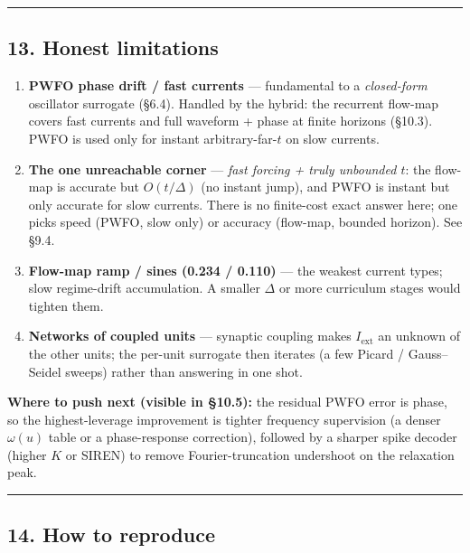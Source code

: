 \documentclass[
  11pt,
]{article}
\providecommand{\tightlist}{%
  \setlength{\itemsep}{0pt}\setlength{\parskip}{0pt}}
\begin{document}
\begin{center}\rule{0.5\linewidth}{0.5pt}\end{center}

\subsection{13. Honest limitations}\label{honest-limitations}

\begin{enumerate}
\def\labelenumi{\arabic{enumi}.}
\tightlist
\item
  \textbf{PWFO phase drift / fast currents} --- fundamental to a
  \emph{closed-form} oscillator surrogate (§6.4). Handled by the hybrid:
  the recurrent flow-map covers fast currents and full waveform + phase
  at finite horizons (§10.3). PWFO is used only for instant
  arbitrary-far-\(t\) on slow currents.
\item
  \textbf{The one unreachable corner} --- \emph{fast forcing + truly
  unbounded \(t\)}: the flow-map is accurate but \(O(t/\Delta)\) (no
  instant jump), and PWFO is instant but only accurate for slow
  currents. There is no finite-cost exact answer here; one picks speed
  (PWFO, slow only) or accuracy (flow-map, bounded horizon). See §9.4.
\item
  \textbf{Flow-map ramp / sines (0.234 / 0.110)} --- the weakest current
  types; slow regime-drift accumulation. A smaller \(\Delta\) or more
  curriculum stages would tighten them.
\item
  \textbf{Networks of coupled units} --- synaptic coupling makes
  \(I_{\mathrm{ext}}\) an unknown of the other units; the per-unit
  surrogate then iterates (a few Picard / Gauss--Seidel sweeps) rather
  than answering in one shot.
\end{enumerate}

\textbf{Where to push next (visible in §10.5):} the residual PWFO error
is phase, so the highest-leverage improvement is tighter frequency
supervision (a denser \(\omega(u)\) table or a phase-response
correction), followed by a sharper spike decoder (higher \(K\) or SIREN)
to remove Fourier-truncation undershoot on the relaxation peak.

\begin{center}\rule{0.5\linewidth}{0.5pt}\end{center}

\subsection{14. How to reproduce}\label{how-to-reproduce}
\end{document}
